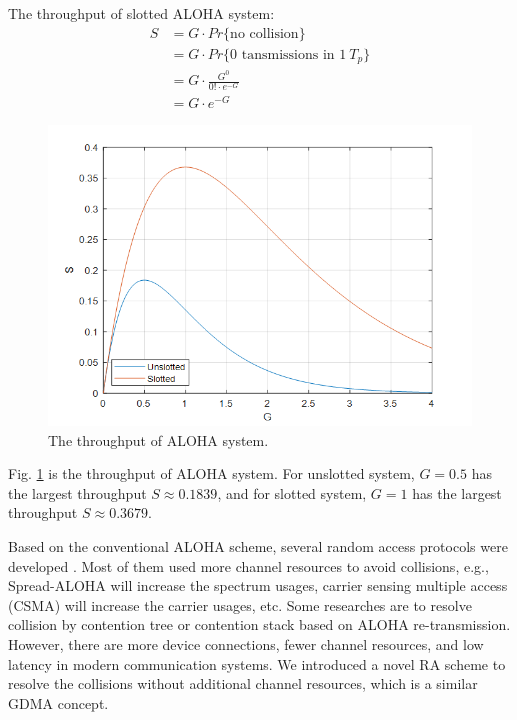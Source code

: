 The throughput of slotted ALOHA system:	
\begin{align}
S &= G \cdot Pr \{ \text{no collision} \}  \nonumber \\
  &= G \cdot Pr \{ \text{0 tansmissions in 1} \  T_p \} \nonumber \\
  &= G \cdot \frac{{G}^{0}}{0! \cdot e^{-G}} \nonumber \\
  &= G \cdot e^{-G}
\end{align}

\begin{figure}[t!]
 \centering
 \includegraphics[width=15cm]{fig/RACH_ALOHA_throughput.png}
 \caption{The throughput of ALOHA system.}
 \label{fig:RACH_ALOHA_throughput}
\end{figure}

Fig. \ref{fig:RACH_ALOHA_throughput} is the throughput of ALOHA system. For unslotted system, $G = 0.5$ has the largest throughput $S \approx 0.1839 $, and for slotted system, $G = 1$ has the largest throughput $S \approx 0.3679$.

Based on the conventional ALOHA scheme, several random access protocols were developed \cite{alohaspread2005} \cite{massey1981collision} \cite{slottedalohathroughput} \cite{unslottedCDMA}. Most of them used more channel resources to avoid collisions, e.g.,  Spread-ALOHA will increase the spectrum usages, carrier sensing multiple access (CSMA) will increase the carrier usages, etc. Some researches are to resolve collision by contention tree or contention stack based on ALOHA re-transmission. However, there are more device connections, fewer channel resources, and low latency in modern communication systems. We introduced a novel RA scheme to resolve the collisions without additional channel resources, which is a similar GDMA concept.

